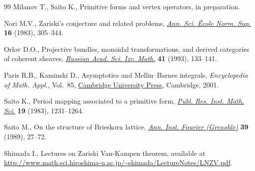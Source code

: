 \documentclass[pdftex]{sigma}
\numberwithin{equation}{section}
\begin{document}
\begin{thebibliography}{99}
Milanov T., Saito K., Primitive forms and vertex operators, {i}n preparation.

Nori M.V., Zariski's conjecture and related problems, \href{https://doi.org/10.24033/asens.1450}{\textit{Ann. Sci. \'Ecole
 Norm. Sup.}} \textbf{16} (1983), 305--344.

Orlov D.O., Projective bundles, monoidal transformations, and derived
 categories of coherent sheaves, \href{https://doi.org/10.1070/IM1993v041n01ABEH002182}{\textit{Russian Acad. Sci. Izv. Math.}}
 \textbf{41} (1993), 133--141.

Paris R.B., Kaminski D., Asymptotics and {M}ellin--{B}arnes integrals,
 \textit{Encyclopedia of Math. Appl.}, Vol.~85, \href{https://doi.org/10.1017/CBO9780511546662}{Cambridge University Press},
 Cambridge, 2001.

Saito K., Period mapping associated to a primitive form, \href{https://doi.org/10.2977/prims/1195182028}{\textit{Publ. Res.
 Inst. Math. Sci.}} \textbf{19} (1983), 1231--1264.

Saito M., On the structure of {B}rieskorn lattice, \href{https://doi.org/10.5802/aif.1157}{\textit{Ann. Inst. Fourier
 (Grenoble)}} \textbf{39} (1989), 27--72.

Shimada I., Lectures on {Z}ariski {V}an-{K}ampen theorem, available at
 \url{http://www.math.sci.hiroshima-u.ac.jp/~shimada/LectureNotes/LNZV.pdf}.

\end{thebibliography}\LastPageEnding
\end{document}
